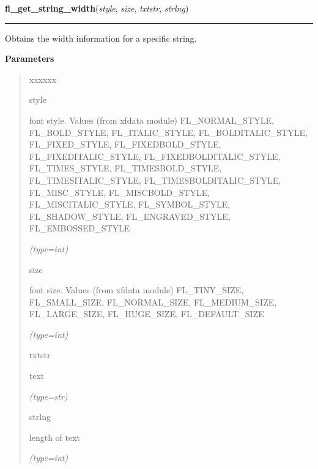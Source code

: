 \hspace{.8\funcindent}\begin{boxedminipage}{\funcwidth}

    \raggedright \textbf{fl\_get\_string\_width}(\textit{style}, \textit{size}, \textit{txtstr}, \textit{strlng})

    \vspace{-1.5ex}

    \rule{\textwidth}{0.5\fboxrule}
\setlength{\parskip}{2ex}
    Obtains the width information for a specific string.

\setlength{\parskip}{1ex}
      \textbf{Parameters}
      \vspace{-1ex}

      \begin{quote}
        \begin{Ventry}{xxxxxx}

          \item[style]

          font style. Values (from xfdata module) FL\_NORMAL\_STYLE, 
          FL\_BOLD\_STYLE, FL\_ITALIC\_STYLE, FL\_BOLDITALIC\_STYLE, 
          FL\_FIXED\_STYLE, FL\_FIXEDBOLD\_STYLE, FL\_FIXEDITALIC\_STYLE, 
          FL\_FIXEDBOLDITALIC\_STYLE, FL\_TIMES\_STYLE, 
          FL\_TIMESBOLD\_STYLE, FL\_TIMESITALIC\_STYLE, 
          FL\_TIMESBOLDITALIC\_STYLE, FL\_MISC\_STYLE, FL\_MISCBOLD\_STYLE,
          FL\_MISCITALIC\_STYLE, FL\_SYMBOL\_STYLE, FL\_SHADOW\_STYLE, 
          FL\_ENGRAVED\_STYLE, FL\_EMBOSSED\_STYLE

            {\it (type=int)}

          \item[size]

          font size. Values (from xfdata module) FL\_TINY\_SIZE, 
          FL\_SMALL\_SIZE, FL\_NORMAL\_SIZE, FL\_MEDIUM\_SIZE, 
          FL\_LARGE\_SIZE, FL\_HUGE\_SIZE, FL\_DEFAULT\_SIZE

            {\it (type=int)}

          \item[txtstr]

          text

            {\it (type=str)}

          \item[strlng]

          length of text

            {\it (type=int)}

        \end{Ventry}


\end{quote}
\end{boxedminipage}
